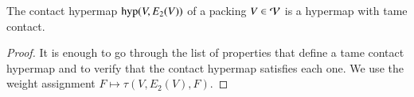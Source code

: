 \documentclass{llncs}
\def\op#1{{\hbox{#1}}}
\begin{document}

\begin{theorem} The contact hypermap $\op{hyp}(V,E_2(V))$ of a 
  packing $V\in {\mathcal V}$ is a hypermap with tame contact.
\end{theorem}
%
%
%

\begin{proof} It is enough to go through the list of properties that
  define a tame contact hypermap and to verify that the contact
  hypermap satisfies each one.  We use the weight assignment $F\mapsto
  \tau(V,E_2(V),F)$.


\end{proof}
\end{document}
